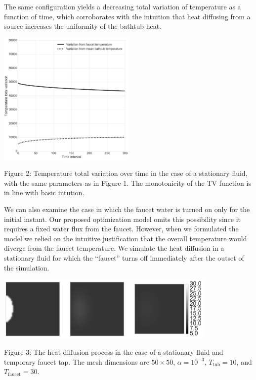 \documentclass[12pt]{amsart}
\begin{document}
The same configuration yields a decreasing total variation of temperature as a function
of time, which corroborates with the intuition that heat diffusing from a source
increases the uniformity of the bathtub heat.

\begin{center}
    \includegraphics[width=0.5\textwidth]{../plots/tv-01.png}

    Figure 2: Temperature total variation over time in the case of a stationary
    fluid, with the same parameters as in Figure 1. The monotonicity of the TV
    function is in line with basic intution.
\end{center}

We can also examine the case in which the faucet water is turned on only for the
initial instant. Our proposed optimization model omits this possibility since it
requires a fixed water flux from the faucet. However, when we formulated the
model we relied on the intuitive justification that the overall temperature
would diverge from the faucet temperature. We simulate the heat diffusion in a
stationary fluid for which the ``faucet'' turns off immediately after the outset
of the simulation. 

\begin{center}
    \includegraphics[width=0.8\textwidth]{../plots/diffusion-02.png}

    Figure 3: The heat diffusion process in the case of a stationary fluid and
    temporary faucet tap. The mesh dimensions are $50 \times 50$, $\alpha =
    10^{-3}$, $T_{\mathrm{tub}} = 10$, and $T_{\mathrm{faucet}} = 30$.
\end{center}
\end{document}
